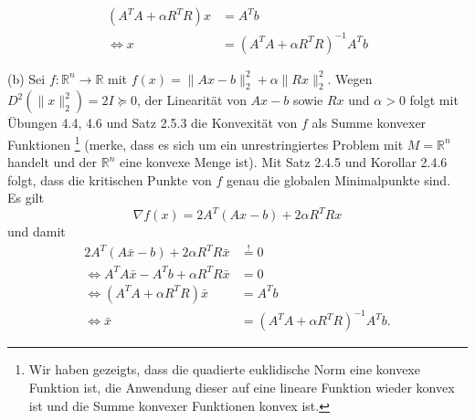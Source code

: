 \documentclass[ngerman, a4paper,12pt]{article}
\begin{document}
\begin{equation*}
	\begin{split}
	(A^TA+\alpha R^TR)x &=A^Tb \\
	\Leftrightarrow x&= (A^TA+\alpha R^TR)^{-1} A^Tb	
	\end{split}
\end{equation*}
\par
(b) Sei $f: \mathbb{R}^n \rightarrow \mathbb{R}$ mit $f(x) = \|Ax-b \|_2^2 + \alpha \|Rx \|_2^2$. Wegen $D^2( \|x \|_2^2)=2I \succeq 0$, der Linearität von $Ax-b$ sowie $Rx$ und $\alpha > 0$ folgt mit Übungen 4.4, 4.6 und Satz 2.5.3 die Konvexität von $f$ als Summe konvexer Funktionen \footnote{Wir haben gezeigts, dass die quadierte euklidische Norm eine konvexe Funktion ist, die Anwendung dieser auf eine lineare Funktion wieder konvex ist und die Summe konvexer Funktionen konvex ist.} (merke, dass es sich um ein unrestringiertes Problem mit $M=\mathbb{R}^n$ handelt und der $\mathbb{R}^n$ eine konvexe Menge ist). Mit Satz 2.4.5 und Korollar 2.4.6 folgt, dass die kritischen Punkte von $f$ genau die globalen Minimalpunkte sind. Es gilt
\begin{equation}
	\nabla f(x) = 2A^T(Ax-b) + 2\alpha R^TRx
\end{equation}
und damit
\begin{equation*}
	\begin{split}
		2A^T(A\bar{x}-b) + 2\alpha R^TR\bar{x} &\stackrel{!}{=} 0 \\
		\Leftrightarrow A^TA\bar{x}-A^Tb+\alpha R^TR\bar{x} &=0 \\
		\Leftrightarrow (A^TA+\alpha R^TR)\bar{x} &=A^Tb \\
		\Leftrightarrow \bar{x} &= (A^TA+\alpha R^TR)^{-1}A^Tb.
	\end{split}
\end{equation*}
\end{document}
